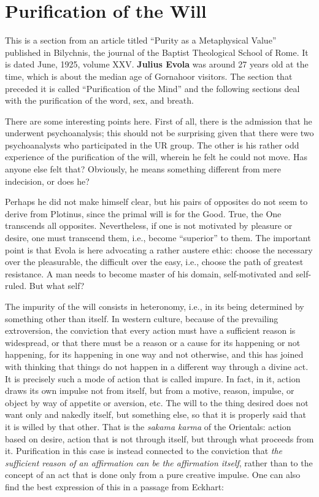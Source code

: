 \section{Purification of the Will}

\begin{quotex}
This is a section from an article titled “Purity as a Metaphysical Value” published in Bilychnis, the journal of the Baptist Theological School of Rome. It is dated June, 1925, volume XXV. \textbf{Julius Evola} was around 27 years old at the time, which is about the median age of Gornahoor visitors. The section that preceded it is called “Purification of the Mind” and the following sections deal with the purification of the word, sex, and breath.

There are some interesting points here. First of all, there is the admission that he underwent psychoanalysis; this should not be surprising given that there were two psychoanalysts who participated in the UR group. The other is his rather odd experience of the purification of the will, wherein he felt he could not move. Has anyone else felt that? Obviously, he means something different from mere indecision, or does he?


Perhaps he did not make himself clear, but his pairs of opposites do not seem to derive from Plotinus, since the primal will is for the Good. True, the One transcends all opposites. Nevertheless, if one is not motivated by pleasure or desire, one must transcend them, i.e., become “superior” to them. The important point is that Evola is here advocating a rather austere ethic: choose the necessary over the pleasurable, the difficult over the easy, i.e., choose the path of greatest resistance. A man needs to become master of his domain, self-motivated and self-ruled. But what self? 

\end{quotex}
The impurity of the will consists in heteronomy, i.e., in its being determined by something other than itself. In western culture, because of the prevailing extroversion, the conviction that every action must have a sufficient reason is widespread, or that there must be a reason or a cause for its happening or not happening, for its happening in one way and not otherwise, and this has joined with thinking that things do not happen in a different way through a divine act. It is precisely such a mode of action that is called impure. In fact, in it, action draws its own impulse not from itself, but from a motive, reason, impulse, or object by way of appetite or aversion, etc. The will to the thing desired does not want only and nakedly itself, but something else, so that it is properly said that it is willed by that other. That is the \textit{sakama karma} of the Orientals: action based on desire, action that is not through itself, but through what proceeds from it. Purification in this case is instead connected to the conviction that \textit{the sufficient reason of an affirmation can be the affirmation itself}, rather than to the concept of an act that is done only from a pure creative impulse. One can also find the best expression of this in a passage from Eckhart:

